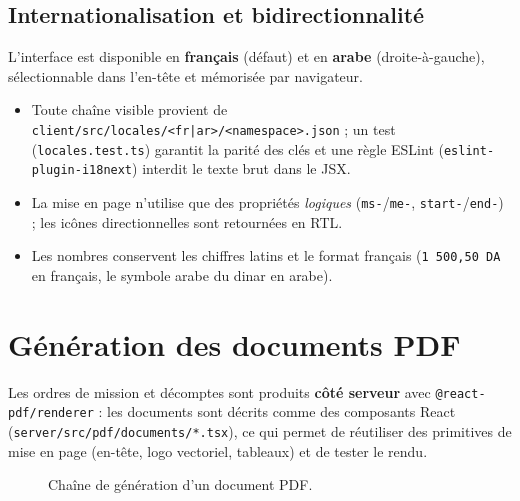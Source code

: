 \documentclass[10.5pt,a4paper]{article}
\newcommand{\code}[1]{\texttt{\small #1}}
\begin{document}
\subsection{Internationalisation et bidirectionnalité}
L'interface est disponible en \textbf{français} (défaut) et en \textbf{arabe} (droite-à-gauche), sélectionnable
dans l'en-tête et mémorisée par navigateur.
\begin{itemize}
  \item Toute chaîne visible provient de \code{client/src/locales/<fr|ar>/<namespace>.json} ; un test (\code{locales.test.ts}) garantit la parité des clés et une règle ESLint (\code{eslint-plugin-i18next}) interdit le texte brut dans le JSX.
  \item La mise en page n'utilise que des propriétés \emph{logiques} (\code{ms-}/\code{me-}, \code{start-}/\code{end-}) ; les icônes directionnelles sont retournées en RTL.
  \item Les nombres conservent les chiffres latins et le format français (\code{1 500,50 DA} en français, le symbole arabe du dinar en arabe).
\end{itemize}

\section{Génération des documents PDF}

Les ordres de mission et décomptes sont produits \textbf{côté serveur} avec \code{@react-pdf/renderer} :
les documents sont décrits comme des composants React (\code{server/src/pdf/documents/*.tsx}), ce qui
permet de réutiliser des primitives de mise en page (en-tête, logo vectoriel, tableaux) et de tester
le rendu.

\begin{figure}[h]
\centering
{}
\caption{Chaîne de génération d'un document PDF.}
\end{figure}
\end{document}
